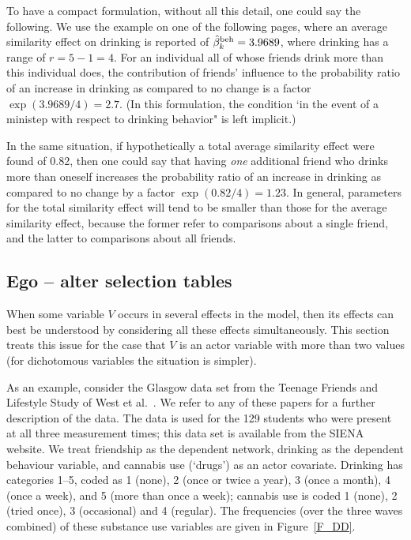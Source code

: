 \documentclass[a4paper,fleqn,11pt]{article}
\newcommand{\+}{\, + \,}
\newcommand{\SI}{{\sf SIENA }}
\begin{document}
To have a compact formulation, without all this detail, one could
say the following. We use the example on one of the following
pages, where an average similarity effect on drinking is reported of
$\hat\beta^{\rm beh}_k = 3.9689$, where drinking has a range of $r = 5-1 = 4$.
For an individual all of whose friends drink more than this individual does,
the contribution of friends' influence to the probability ratio of an increase in drinking
as compared to no change is a factor $\exp(3.9689/4) = 2.7$.
(In this formulation, the condition `in the event of a ministep
with respect to drinking behavior" is left implicit.)

In the same situation, if hypothetically a total average similarity
effect were found of 0.82, then one could say that having \emph{one} additional
friend who drinks more than oneself increases the probability ratio of an increase in drinking
as compared to no change by a factor $\exp(0.82/4) = 1.23$.
In general, parameters for the total similarity effect will tend to be
smaller than those for the average similarity effect, because the former
refer to comparisons about a single friend, and the latter to comparisons
about all friends.

\subsection{Ego -- alter selection tables}

When some variable $V$ occurs in several effects in the model,
then its effects can best be understood
by considering all these effects simultaneously.
This section treats this issue for the case that $V$ is an
actor variable with more than two values (for dichotomous
variables the situation is simpler).

As an example, consider the
Glasgow data set from the Teenage Friends and Lifestyle Study of
West et al.\ \citep{MichellWest1996,PearsonWest03,SteglichEA10}.
We refer to any of these papers for a further description of the data.
The data is used for the 129 students who were present at all three measurement
times; this data set is available from the \SI website.
We treat friendship as the dependent network, drinking as the
dependent behaviour variable, and cannabis use (`drugs') as an
actor covariate.
Drinking has categories 1--5, coded as
1 (none), 2 (once or twice a year), 3 (once a month), 4 (once a week),
and 5 (more than once a week);
cannabis use is coded 1 (none), 2 (tried once), 3 (occasional) and 4 (regular).
The frequencies (over the three waves combined) of these substance
use variables are given in Figure~\ref{F_DD}.
\end{document}
